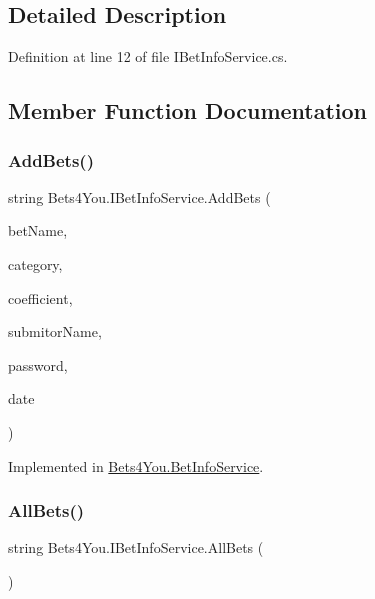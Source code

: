\subsection{Detailed Description}


Definition at line 12 of file I\+Bet\+Info\+Service.\+cs.



\subsection{Member Function Documentation}
\mbox{\label{interface_bets4_you_1_1_i_bet_info_service_a15b9ce927d209a38ee245acf764755b1}} 
\subsubsection{\texorpdfstring{AddBets()}{AddBets()}}
{\footnotesize\ttfamily string Bets4\+You.\+I\+Bet\+Info\+Service.\+Add\+Bets (\begin{DoxyParamCaption}\item[{string}]{bet\+Name,  }\item[{string}]{category,  }\item[{int}]{coefficient,  }\item[{string}]{submitor\+Name,  }\item[{string}]{password,  }\item[{Date\+Time}]{date }\end{DoxyParamCaption})}



Implemented in \mbox{\hyperlink{class_bets4_you_1_1_bet_info_service_a7e982447a6e04dcc798edef35ac73e43}{Bets4\+You.\+Bet\+Info\+Service}}.

\mbox{\label{interface_bets4_you_1_1_i_bet_info_service_ad0dd9958108c51bd4fe08c1fa9c47a53}} 
\subsubsection{\texorpdfstring{AllBets()}{AllBets()}}
{\footnotesize\ttfamily string Bets4\+You.\+I\+Bet\+Info\+Service.\+All\+Bets (\begin{DoxyParamCaption}{ }\end{DoxyParamCaption})}



